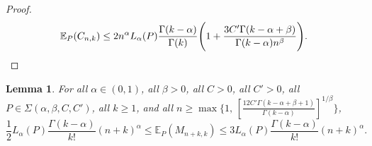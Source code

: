 \documentclass{article}
\newtheorem{lemma}{Lemma}
\newcommand{\1}{\boldsymbol{1}}
\newcommand{\EE}{\mathbb{E}}
\theoremstyle{plain}
\begin{document}
\begin{proof}
    \begin{equation*}
      \EE_P(C_{n,k})%
      \leq 2n^{\alpha}L_{\alpha}(P)\frac{\Gamma(k-\alpha)}{\Gamma(k)}\Bigg(1%
        + \frac{3C'\Gamma(k-\alpha+\beta)}{\Gamma(k-\alpha)n^{\beta}}\Bigg). \qedhere
      \end{equation*}
\end{proof}

  \begin{lemma}
    \label{lem:38jul}
    For all $\alpha \in (0,1)$, all $\beta > 0$, all $C > 0$, all $C'>0$, all $P\in \Sigma(\alpha,\beta,C,C')$, all $k\geq 1$, and all $n \geq \max\{1,\, [\frac{12C'\Gamma(k-\alpha+\beta+1)}{\Gamma(k-\alpha)}]^{1/\beta}\}$,
    \begin{equation*}
      \frac{1}{2}L_{\alpha}(P)\frac{\Gamma(k-\alpha)}{k!}(n+k)^{\alpha}%
      \leq \EE_P(M_{n+k,k})%
        \leq
      3 L_{\alpha}(P)\frac{\Gamma(k-\alpha)}{k!}(n+k)^{\alpha}.%
    \end{equation*}
  \end{lemma}
\end{document}
